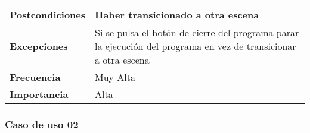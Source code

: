 \begin{tabularx}{\columnwidth}{l|l}
\begin{minipage}{0.25\columnwidth}
\textbf{Postcondiciones} 
\end{minipage}
&
\begin{minipage}{0.65\columnwidth}
Haber transicionado a otra escena
\end{minipage}
\\ \hline

\begin{minipage}{0.25\columnwidth}
\textbf{Excepciones} 
\end{minipage}
&
\begin{minipage}{0.65\columnwidth}
Si se pulsa el botón de cierre del programa parar la ejecución del programa en vez de transicionar a otra escena
\end{minipage}
\\ \hline

\begin{minipage}{0.25\columnwidth}
\textbf{Frecuencia} 
\end{minipage}
&
\begin{minipage}{0.65\columnwidth}
Muy Alta
\end{minipage}
\\ \hline

\begin{minipage}{0.25\columnwidth}
\textbf{Importancia} 
\end{minipage}
&
\begin{minipage}{0.65\columnwidth}
Alta
\end{minipage}
\\ \hline
\end{tabularx}

\subsubsection{Caso de uso 02}

